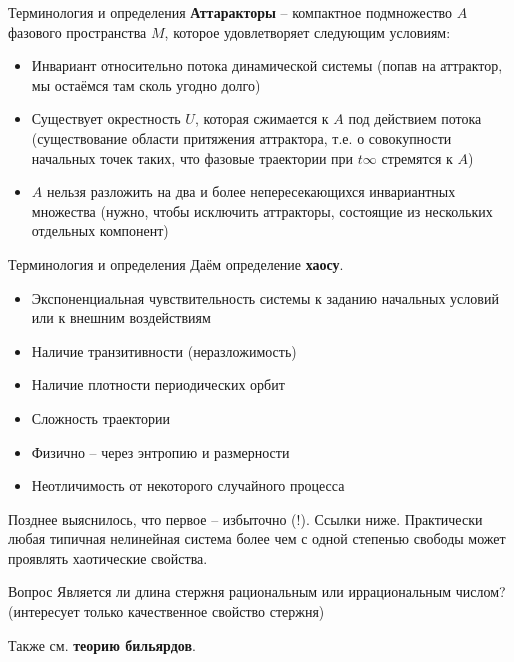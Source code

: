 \documentclass{beamer}
\begin{document}
\begin{frame}{Терминология и определения}
        \textbf{Аттаракторы} -- компактное подмножество $A$ фазового пространства $M$, которое удовлетворяет следующим условиям:
                \begin{itemize}
                        \item Инвариант относительно потока динамической системы (попав на аттрактор, мы остаёмся там сколь угодно долго)
                        \item Существует окрестность $U$, которая сжимается к $A$ под действием потока (существование области притяжения аттрактора, т.е. о совокупности начальных точек таких, что фазовые траектории при $t \infty$ стремятся к $A$)
                        \item $A$ нельзя разложить на два и более непересекающихся инвариантных множества (нужно, чтобы исключить аттракторы, состоящие из нескольких отдельных компонент)
                \end{itemize}
\end{frame}


\begin{frame}{Терминология и определения}
        Даём определение \textbf{хаосу}.
                \begin{itemize}
                        \item Экспоненциальная чувствительность системы к заданию начальных условий или к внешним воздействиям
                        \item Наличие транзитивности (неразложимость)
                        \item Наличие плотности периодических орбит
                        \item Сложность траектории
                        \item Физично -- через энтропию и размерности
                        \item Неотличимость от некоторого случайного процесса
                \end{itemize}
                Позднее выяснилось, что первое -- избыточно (!). Ссылки ниже.
                Практически любая типичная нелинейная система более чем с одной степенью свободы может проявлять хаотические свойства.
\end{frame}


\begin{frame}{Вопрос}
        Является ли длина стержня рациональным или иррациональным числом? (интересует только качественное свойство стержня)

        Также см. \textbf{теорию бильярдов}. 
\end{frame}
\end{document}
